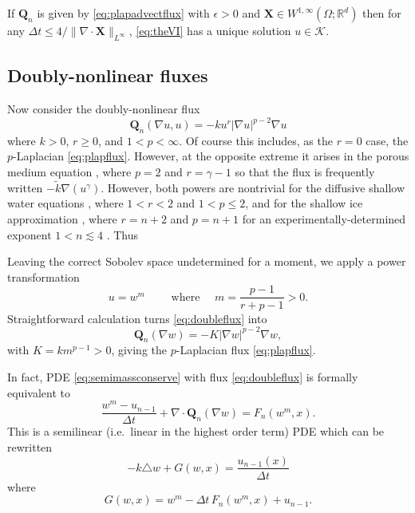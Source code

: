 \documentclass[final,leqno,onefignum,onetabnum]{siamltex1213bueler}
\newcommand\bQ{\mathbf{Q}}
\newcommand\bX{\mathbf{X}}
\newcommand{\Div}{\nabla\cdot}
\newcommand\eps{\epsilon}
\renewcommand{\grad}{\nabla}
\newcommand\lap{\triangle}
\newcommand\RR{\mathbb{R}}
\begin{document}
\begin{theorem}  \label{thm:plapadvectwellposed}  If $\bQ_n$ is given by \eqref{eq:plapadvectflux} with $\eps>0$ and $\bX \in W^{1,\infty}(\Omega;\RR^d)$ then for any $\Delta t \le 4 / \|\Div \bX\|_{L^\infty}$, \eqref{eq:theVI} has a unique solution $u\in\mathcal{K}$.
\end{theorem}

\subsection{Doubly-nonlinear fluxes} \label{subsec:powertransform}  Now consider the doubly-nonlinear \cite{Raviart1970} flux
\begin{equation}
  \bQ_n(\grad u,u) = - k u^r |\grad u|^{p-2} \grad u \label{eq:doubleflux}
\end{equation}
where $k>0$, $r\ge 0$, and $1<p<\infty$.  Of course this includes, as the $r=0$ case, the $p$-Laplacian \eqref{eq:plapflux}.  However, at the opposite extreme it arises in the porous medium equation \cite{Vazquez2007}, where $p=2$ and $r=\gamma-1$ so that the flux is frequently written $- \tilde k \grad(u^\gamma)$.  However, both powers are nontrivial for the diffusive shallow water equations \cite{AlonsoSantillanaDawson}, where $1<r<2$ and $1<p\le 2$, and for the shallow ice approximation \cite{CDDSV,JouvetBueler2012}, where $r=n+2$ and $p=n+1$ for an experimentally-determined exponent $1 < n \lesssim 4$ \cite{GoldsbyKohlstedt2001}.  Thus

Leaving the correct Sobolev space undetermined for a moment, we apply a power transformation
\begin{equation}
	u = w^m \qquad \text{ where } \quad m = \frac{p-1}{r+p-1} > 0. \label{eq:doubletransform}
\end{equation}
Straightforward calculation turns \eqref{eq:doubleflux} into
\begin{equation}
	\bQ_n(\grad w) = - K |\grad w|^{p-2} \grad w, \label{eq:doublenewflux}
\end{equation}
with $K=k m^{p-1}>0$, giving the $p$-Laplacian flux \eqref{eq:plapflux}.

In fact, PDE \eqref{eq:semimassconserve} with flux \eqref{eq:doubleflux} is formally equivalent to
\begin{equation}
    \frac{w^m - u_{n-1}}{\Delta t} + \Div \bQ_n(\grad w) = F_n(w^m,x).  \label{eq:doublestrong}
\end{equation}
This is a semilinear (i.e.~linear in the highest order term) PDE which can be rewritten
\begin{equation}
    - k \lap w + G(w,x) = \frac{u_{n-1}(x)}{\Delta t} \label{eq:doublesemilinear}
\end{equation}
where
\begin{equation}
   G(w,x) = w^m - \Delta t\, F_n(w^m,x) + u_{n-1}. \label{eq:doubleGdefn}
\end{equation}
\end{document}
